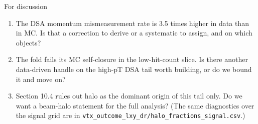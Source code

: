 \documentclass[aspectratio=169,10pt]{beamer}
\begin{document}
\begin{frame}{For discussion}
  \begin{enumerate}\setlength{\itemsep}{14pt}
    \item The DSA momentum mismeasurement rate is 3.5 times higher in data than in MC. Is that a
          correction to derive or a systematic to assign, and on which objects?
    \item The fold fails its MC self-closure in the low-hit-count slice. Is there another data-driven
          handle on the high-pT DSA tail worth building, or do we bound it and move on?
    \item Section 10.4 rules out halo as the dominant origin of this tail only. Do we want a beam-halo
          statement for the full analysis? (The same diagnostics over the signal grid are in
          \texttt{vtx\_outcome\_lxy\_dr/halo\_fractions\_signal.csv}.)
  \end{enumerate}
\end{frame}
\end{document}
